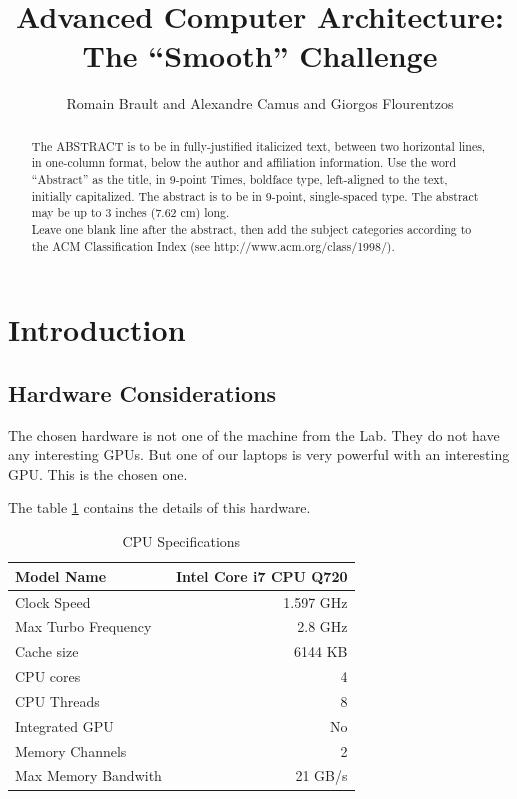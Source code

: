 \documentclass{egpubl}
\title[ACA: The ``Smooth'' Challenge]{Advanced Computer Architecture: The ``Smooth'' Challenge}
\author[R. Brault \& A. Camus \& G. Flourentzos]{Romain Brault and Alexandre Camus and  Giorgos Flourentzos}
\begin{document}


\maketitle

\begin{abstract}
   The ABSTRACT is to be in fully-justified italicized text, 
   between two horizontal lines,
   in one-column format, 
   below the author and affiliation information. 
   Use the word ``Abstract'' as the title, in 9-point Times, boldface type, 
   left-aligned to the text, initially capitalized. 
   The abstract is to be in 9-point, single-spaced type.
   The abstract may be up to 3 inches (7.62 cm) long. \\
   Leave one blank line after the abstract, 
   then add the subject categories according to the ACM Classification Index 
   (see http://www.acm.org/class/1998/).

\end{abstract}




\section{Introduction}


\subsection{Hardware Considerations}

The chosen hardware is not one of the machine from the Lab. They do not have any interesting GPUs. But one of our laptops is very powerful with an interesting GPU. This is the chosen one.

The table \ref{CPUspec} contains the details of this hardware.
\begin{table}[h]
\centering
\begin{tabular}{|l|r|}
\hline
Model Name & Intel Core i7 CPU Q720 \\
\hline
Clock Speed & 1.597 GHz \\
\hline
Max Turbo Frequency & 2.8 GHz \\
\hline
Cache size & 6144 KB \\
\hline
CPU cores & 4 \\
\hline
CPU Threads & 8 \\
\hline
Integrated GPU & No \\
\hline
Memory Channels & 2 \\
\hline
Max Memory Bandwith & 21 GB/s \\
\hline
\end{tabular}
\caption{CPU Specifications}
\label{CPUspec}
\end{table}
\end{document}
